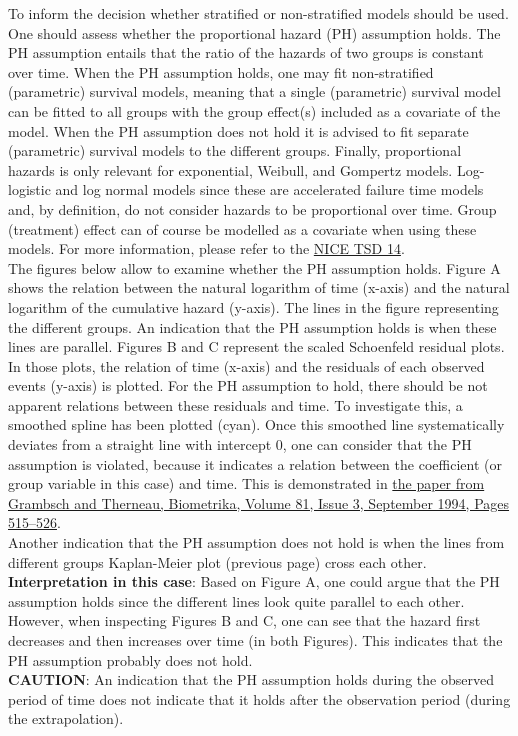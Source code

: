 \documentclass[
]{article}
\begin{document}
To inform the decision whether stratified or non-stratified models
should be used. One should assess whether the proportional hazard (PH)
assumption holds. The PH assumption entails that the ratio of the
hazards of two groups is constant over time. When the PH assumption
holds, one may fit non-stratified (parametric) survival models, meaning
that a single (parametric) survival model can be fitted to all groups
with the group effect(s) included as a covariate of the model. When the
PH assumption does not hold it is advised to fit separate (parametric)
survival models to the different groups. Finally, proportional hazards
is only relevant for exponential, Weibull, and Gompertz models.
Log-logistic and log normal models since these are accelerated failure
time models and, by definition, do not consider hazards to be
proportional over time. Group (treatment) effect can of course be
modelled as a covariate when using these models. For more information,
please refer to the
\href{http://nicedsu.org.uk/wp-content/uploads/2016/03/NICE-DSU-TSD-Survival-analysis.updated-March-2013.v2.pdf}{NICE
TSD 14}.\\
The figures below allow to examine whether the PH assumption holds.
Figure A shows the relation between the natural logarithm of time
(x-axis) and the natural logarithm of the cumulative hazard (y-axis).
The lines in the figure representing the different groups. An indication
that the PH assumption holds is when these lines are parallel. Figures B
and C represent the scaled Schoenfeld residual plots. In those plots,
the relation of time (x-axis) and the residuals of each observed events
(y-axis) is plotted. For the PH assumption to hold, there should be not
apparent relations between these residuals and time. To investigate
this, a smoothed spline has been plotted (cyan). Once this smoothed line
systematically deviates from a straight line with intercept 0, one can
consider that the PH assumption is violated, because it indicates a
relation between the coefficient (or group variable in this case) and
time. This is demonstrated in
\href{https://doi.org/10.1093/biomet/81.3.515}{the paper from Grambsch
and Therneau, Biometrika, Volume 81, Issue 3, September 1994, Pages
515--526}.\\
Another indication that the PH assumption does not hold is when the
lines from different groups Kaplan-Meier plot (previous page) cross each
other.\\
\textbf{Interpretation in this case}: Based on Figure A, one could argue
that the PH assumption holds since the different lines look quite
parallel to each other. However, when inspecting Figures B and C, one
can see that the hazard first decreases and then increases over time (in
both Figures). This indicates that the PH assumption probably does not
hold.\\
\textbf{CAUTION}: An indication that the PH assumption holds during the
observed period of time does not indicate that it holds after the
observation period (during the extrapolation).
\end{document}

